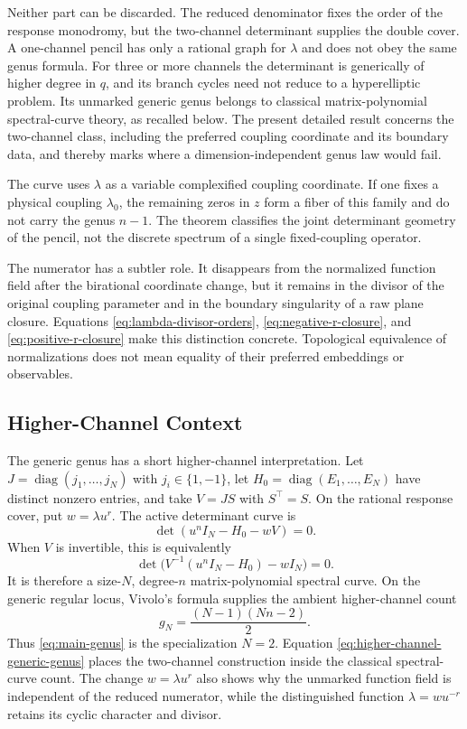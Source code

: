 \documentclass[11pt,reqno]{amsart}
\theoremstyle{remark}
\newcommand{\diag}{\operatorname{diag}}
\begin{document}
Neither part can be discarded.  The reduced denominator fixes the order of
the response monodromy, but the two-channel determinant supplies the double
cover.  A one-channel pencil has only a rational graph for $\lambda$ and does
not obey the same genus formula.  For three or more channels the determinant
is generically of higher degree in $q$, and its branch cycles need not reduce
to a hyperelliptic problem.  Its unmarked generic genus belongs to classical
matrix-polynomial spectral-curve theory, as recalled below.  The present
detailed result concerns the two-channel class, including the preferred
coupling coordinate and its boundary data, and thereby marks where a
dimension-independent genus law would fail.

The curve uses $\lambda$ as a variable complexified coupling coordinate.  If
one fixes a physical coupling $\lambda_0$, the remaining zeros in $z$ form a
fiber of this family and do not carry the genus $n-1$.  The theorem classifies
the joint determinant geometry of the pencil, not the discrete spectrum of a
single fixed-coupling operator.

The numerator has a subtler role.  It disappears from the normalized
function field after the birational coordinate change, but it remains in the
divisor of the original coupling parameter and in the boundary singularity
of a raw plane closure.  Equations \eqref{eq:lambda-divisor-orders},
\eqref{eq:negative-r-closure}, and \eqref{eq:positive-r-closure} make this
distinction concrete.  Topological equivalence of normalizations does not
mean equality of their preferred embeddings or observables.

\subsection{Higher-Channel Context}\label{sec:higher-channel-context}

The generic genus has a short higher-channel interpretation.  Let
$J=\diag(j_1,\ldots,j_N)$ with $j_i\in\{1,-1\}$, let
$H_0=\diag(E_1,\ldots,E_N)$ have distinct nonzero entries, and take
$V=JS$ with $S^\top=S$.  On the rational response cover, put
$w=\lambda u^r$.  The active determinant curve is
\begin{equation}\label{eq:higher-channel-curve}
 \det(u^nI_N-H_0-wV)=0.
\end{equation}
When $V$ is invertible, this is equivalently
\[
 \det\bigl(V^{-1}(u^nI_N-H_0)-wI_N\bigr)=0.
\]
It is therefore a size-$N$, degree-$n$ matrix-polynomial spectral curve.
On the generic regular locus, Vivolo's formula \cite{Vivolo2000} supplies
the ambient higher-channel count
\begin{equation}\label{eq:higher-channel-generic-genus}
 g_N=\frac{(N-1)(Nn-2)}{2}.
\end{equation}
Thus \eqref{eq:main-genus} is the specialization $N=2$.  Equation
\eqref{eq:higher-channel-generic-genus} places the two-channel construction
inside the classical spectral-curve count.  The change
$w=\lambda u^r$ also shows why the unmarked function field is independent
of the reduced numerator, while the distinguished function
$\lambda=wu^{-r}$ retains its cyclic character and divisor.
\end{document}
